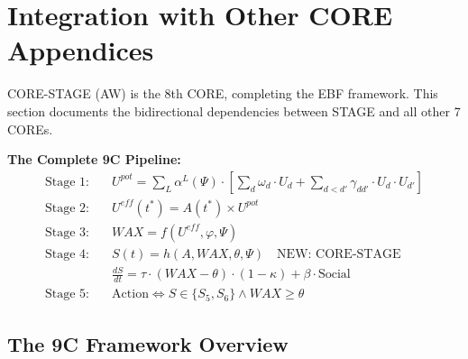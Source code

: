 
\section{Integration with Other CORE Appendices}
\label{sec:bcj-integration}

CORE-STAGE (AW) is the 8th CORE, completing the EBF framework. This section documents the bidirectional dependencies between STAGE and all other 7 COREs.

\begin{tcolorbox}[colback=yellow!5!white, colframe=yellow!75!black,
    title=9C Integration: STAGE in the EBF Pipeline]

\textbf{The Complete 9C Pipeline:}
\begin{align}
\text{Stage 1:} \quad & U^{pot} = \sum_L \alpha^L(\Psi) \cdot \left[\sum_d \omega_d \cdot U_d + \sum_{d<d'} \gamma_{dd'} \cdot U_d \cdot U_{d'}\right] \\
\text{Stage 2:} \quad & U^{eff}(t^*) = A(t^*) \times U^{pot} \\
\text{Stage 3:} \quad & WAX = f(U^{eff}, \varphi, \Psi) \\
\text{Stage 4:} \quad & S(t) = h(A, WAX, \theta, \Psi) \quad \boxed{\text{NEW: CORE-STAGE}} \\
& \frac{dS}{dt} = \tau \cdot (WAX - \theta) \cdot (1-\kappa) + \beta \cdot \text{Social} \\
\text{Stage 5:} \quad & \text{Action} \Leftrightarrow S \in \{S_5, S_6\} \land WAX \geq \theta
\end{align}

\end{tcolorbox}

\subsection{The 9C Framework Overview}

